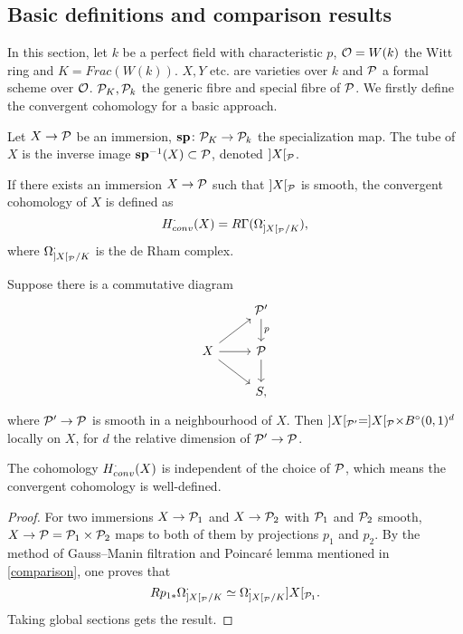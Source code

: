 \subsection{Basic definitions and comparison results}
In this section, let $k$ be a perfect field with characteristic $p$, 
${\mathcal {O}} = W(k)$ the Witt ring and $K = Frac(W(k))$. 
$X, Y$ etc. are varieties over $k$ and 
${\mathcal {P}}$ a formal scheme over ${\mathcal {O}}$. 
${\mathcal {P}}_K, {\mathcal {P}}_k$ the generic fibre and special fibre of ${\mathcal {P}}$.
We firstly define the convergent cohomology for a basic approach.
\begin{definition}
    Let $X \to {\mathcal {P}}$ be an immersion, 
    $\mathbf{sp} \colon {\mathcal {P}}_K \to {\mathcal {P}}_k$ the specialization map. 
    The tube of $X$ is the inverse image $\mathbf{sp}^{-1}(X) \subset {\mathcal {P}}$, denoted $]X[_{\mathcal {P}}$.
\end{definition}

\begin{definition}
    If there exists an immersion $X \to {\mathcal {P}}$ such that 
    $]X[_{\mathcal {P}}$ is smooth, the convergent cohomology of $X$ is defined as
    \[
        H^\cdot_{conv}(X) = R\Gamma(\Omega_{]X[_{\mathcal {P}}/K}^\cdot),
    \]
    where $\Omega_{]X[_{\mathcal {P}}/K}^\cdot$ is the de Rham complex.
\end{definition}

\begin{proposition}
    Suppose there is a commutative diagram 
    \[
        \begin{tikzcd}
            & \CP'\ar[d, "p"]\\
            X \ar[r] \ar[ur] \ar[dr] & \CP \ar[d] \\
            & S,
        \end{tikzcd}
    \]
    where ${\mathcal {P}}' \to {\mathcal {P}}$ is smooth in a neighbourhood of $X$. 
    Then $]X[_{{\mathcal {P}}'} = ]X[_{{\mathcal {P}}} \times B^\circ(0,1)^d$ locally on $X$, 
    for $d$ the relative dimension of ${\mathcal {P}}' \to {\mathcal {P}}$.
\end{proposition}

\begin{proposition}
    The cohomology $H^\cdot_{conv}(X)$ is independent of the choice of ${\mathcal {P}}$, 
    which means the convergent cohomology is well-defined. 
\end{proposition}

\begin{proof}
    For two immersions $X \to {\mathcal {P}}_1$ and $X\to {\mathcal {P}}_2$ with ${\mathcal {P}}_1$ and ${\mathcal {P}}_2$ smooth, 
    $X \to {\mathcal {P}} = {\mathcal {P}}_1 \times {\mathcal {P}}_2$ maps to both of them by projections $p_1$ and $p_2$. 
    By the method of Gauss--Manin filtration and 
    Poincar\'e lemma mentioned in \ref{comparison}, 
    one proves that
    \[
        Rp_{1*} \Omega_{]X[_{\mathcal {P}}/K}^\cdot \simeq \Omega_{]X[_{\mathcal {P}}/K}^\cdot ]X[_{{\mathcal {P}}_1}.
    \] 
    Taking global sections gets the result.
\end{proof}


